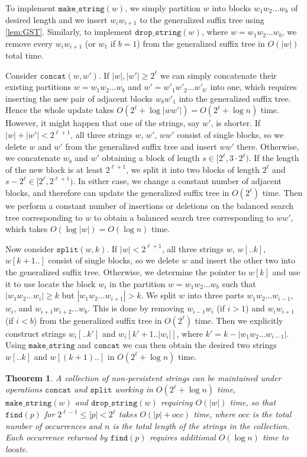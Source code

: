 \documentclass[a4paper]{article}
\newtheorem{theorem}{Theorem}[section]
\theoremstyle{remark}
\newcommand{\makeop}{\mathtt{make\_string}}
\newcommand{\dropop}{\mathtt{drop\_string}}
\newcommand{\concop}{\mathtt{concat}}
\newcommand{\splitop}{\mathtt{split}}
\newcommand{\findop}{\mathtt{find}}
\begin{document}
To implement $\makeop(w)$, we simply partition $w$ into blocks $w_1w_2\ldots w_b$ of desired length and we insert
$w_{i}w_{i+1}$ to the generalized suffix tree using \cref{lem:GST}. Similarly, to implement $\dropop(w)$, where $w = w_1 w_2 \ldots w_b$,
we remove every $w_i w_{i+1}$ (or $w_1$ if $b=1$) from the generalized suffix tree in $O(|w|)$ total time.

Consider $\concop(w,w')$. If $|w|,|w'| \geq 2^{\ell}$ we can simply concatenate
their existing partitions $w = w_1 w_2 \ldots w_b$ and $w' = w'_1 w'_2 \ldots w'_{b'}$ into one,
which requires inserting the new pair of adjacent blocks $w_b w'_1$ into the generalized suffix
tree. Hence the whole update takes $O(2^\ell + \log |ww'|) = O(2^\ell + \log n)$ time. However, it might happen
that one of the strings, say $w'$, is shorter. If $|w| + |w'| < 2^{\ell+1}$, all three strings $w$, $w'$, $ww'$
consist of single blocks, so we delete $w$ and $w'$ from the generalized suffix tree and
insert $ww'$ there.
Otherwise, we concatenate $w_b$ and $w'$ obtaining a block of length
$s\in [2^\ell,3\cdot 2^\ell)$. If the length of the new block is at least $2^{\ell+1}$, we split
it into two blocks of length $2^\ell$ and $s-2^\ell \in [2^\ell,2^{\ell+1})$. In either case,
we change a constant number of adjacent blocks, and therefore can update the generalized
suffix tree in $O(2^\ell)$ time. Then we perform a constant number of insertions or deletions
on the balanced search tree corresponding to $w$ to obtain a balanced search tree corresponding
to $ww'$, which takes $O(\log |w|)=O(\log n)$ time.

Now consider $\splitop(w,k)$. If $|w| < 2^{\ell+1}$, all three strings $w$, $w[..k]$, $w[k+1..]$
consist of single blocks, so we delete $w$ and insert the other two into the generalized suffix tree.
Otherwise, we determine the pointer
to $w[k]$ and use it to use locate the block $w_i$ in the partition $w = w_1 w_2 \ldots w_b$
such that $|w_1 w_2 \ldots w_i| \geq k$ but $|w_1 w_2 \ldots w_{i+1}| > k$. We split
$w$ into three parts $w_1 w_2 \ldots w_{i-1}$, $w_i$, and $w_{i+1} w_{i+2} \ldots w_b$.
This is done by removing $w_{i-1} w_i$ (if $i>1$) and $ w_{i} w_{i+1}$ (if $i<b$) from the generalized suffix tree
in $O(2^\ell)$ time. Then we explicitly construct strings $w_i[..k']$ and $w_i[k'+1..|w_i|]$,
where $k' = k-|w_1 w_2 \ldots w_{i-1}|$. Using $\makeop$ and $\concop$ we can
then obtain the desired two strings $w[..k]$ and $w[(k+1)..]$ in $O(2^\ell+\log n)$ time.

\begin{theorem}
\label{thm:shortpatterns}
A collection of non-persistent strings can be maintained under operations $\concop$ and $\splitop$
working in $O(2^\ell + \log n)$ time, $\makeop(w)$ and $\dropop(w)$ requiring
$O(|w|)$ time, so that $\findop(p)$ for $2^{\ell-1} \le |p|< 2^{\ell}$ takes $O(|p|+occ)$ time,
where $occ$ is the total number of occurrences and $n$ is the total length of the strings
in the collection. Each occurrence returned by $\findop(p)$ requires additional $O(\log n)$ time to locate.
\end{theorem}
\end{document}
